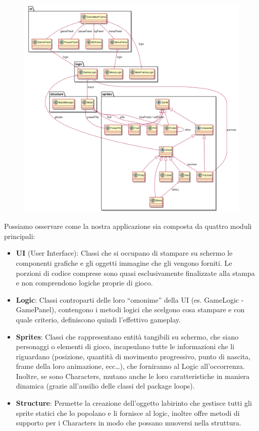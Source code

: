 \documentclass[12pt,a4paper]{report}
\begin{document}
\begin{figure}[bt]
  \centerline{\includegraphics[width=14cm]{jpacman-UML}}
\end{figure}

Possiamo osservare come la nostra applicazione sia composta da quattro moduli principali:
\begin{itemize}
 \item \textbf{UI} (User Interface): Classi che si occupano di stampare su schermo le componenti grafiche e gli oggetti immagine che gli vengono forniti. Le porzioni di codice comprese sono quasi esclusivamente finalizzate alla stampa e non comprendono logiche proprie di gioco.
 \item \textbf{Logic}: Classi controparti delle loro “omonime” della UI (es. GameLogic - GamePanel), contengono i metodi logici che scelgono cosa stampare e con quale criterio, definiscono quindi l’effettivo gameplay.
 \item \textbf{Sprites}: Classi che rappresentano entità tangibili su schermo, che siano personaggi o elementi di gioco, incapsulano tutte le informazioni che li riguardano (posizione, quantità di movimento progressivo, punto di nascita, frame della loro animazione, ecc…), che forniranno al Logic all’occorrenza. Inoltre, se sono Characters, mutano anche le loro caratteristiche in maniera dinamica (grazie all’ausilio delle classi del package loops).
 \item \textbf{Structure}: Permette la creazione dell’oggetto labirinto che gestisce tutti gli sprite statici che lo popolano e li fornisce al logic, inoltre offre metodi di supporto per i Characters in modo che possano muoversi nella struttura.\newpage
\end{itemize}
\end{document}
